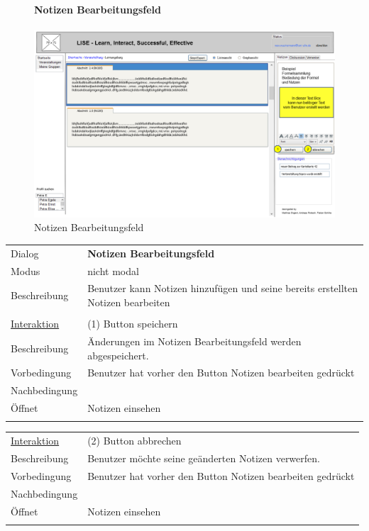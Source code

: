 \documentclass[12pt,a4paper]{article}
\begin{document}
{\begin{figure}[H]
	\paragraph{Notizen Bearbeitungsfeld}
	\includegraphics[width=\textwidth]{Bilder/Mockups/GUI/NotizAendernBearbeitungsfeld[Benutzer].png}
	\caption{Notizen Bearbeitungsfeld}
	\label{GuiNotizenBearbeitungsfeld}
\end{figure}

\begin{tabular}{l p{12cm}}
Dialog 	 		 & \textbf{Notizen Bearbeitungsfeld} \\ 
Modus 			 & nicht modal\\ 
Beschreibung   	 & Benutzer kann Notizen hinzufügen und seine bereits erstellten Notizen bearbeiten \\\\

\underline{Interaktion}  	 & (1) Button speichern\\ 
Beschreibung   	 			 & Änderungen im Notizen Bearbeitungsfeld werden abgespeichert.\\
Vorbedingung	 			 & Benutzer hat vorher den Button  Notizen bearbeiten gedrückt\\
Nachbedingung	 			 & \\
Öffnet			 			 & \glqq Notizen einsehen\grqq \\\\
\end{tabular}

\begin{tabular}{l p{12cm}}
\underline{Interaktion} & (2) Button abbrechen  \\ 
Beschreibung   	 		& Benutzer möchte seine geänderten Notizen verwerfen. \\
Vorbedingung	 		& Benutzer hat vorher den Button  Notizen bearbeiten gedrückt\\
Nachbedingung	 		& \\
Öffnet			 		& \glqq Notizen einsehen\grqq \\\\
\end{tabular}

}
\end{document}
